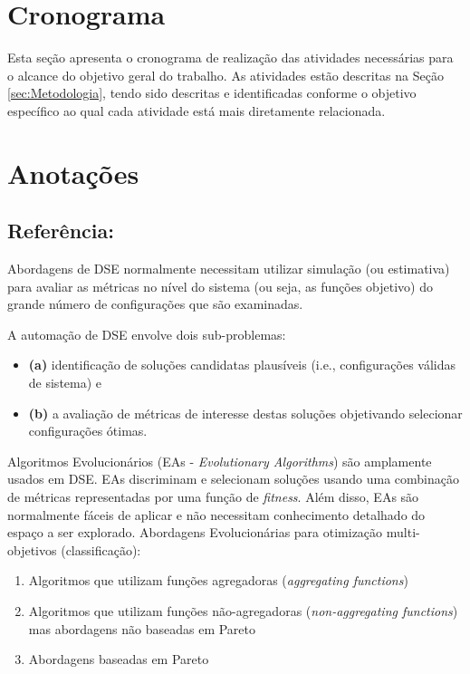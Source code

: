 \documentclass[tese-proposta,nocipinfo]{texufpel}
\begin{document}
\chapter{Cronograma}
Esta seção apresenta o cronograma de realização das atividades necessárias para o alcance do objetivo geral do trabalho. As atividades estão descritas na Seção \ref{sec:Metodologia}, tendo sido descritas e identificadas conforme o objetivo específico ao qual cada atividade está mais diretamente relacionada.




\chapter{Anotações}

\section {Referência: \cite{Panerati2017}}

Abordagens de DSE normalmente necessitam utilizar simulação (ou estimativa) para avaliar as métricas no nível do sistema (ou seja, as funções objetivo) do grande número de configurações que são examinadas.

A automação de DSE envolve dois sub-problemas: 
\begin{itemize}
\item \textbf{(a)} identificação de soluções candidatas plausíveis (i.e., configurações válidas de sistema) e 
\item \textbf{(b)} a avaliação de métricas de interesse destas soluções objetivando selecionar configurações ótimas.
\end{itemize}

Algoritmos Evolucionários (EAs - \textit{Evolutionary Algorithms}) são amplamente usados em DSE. EAs discriminam e selecionam soluções usando uma combinação de métricas representadas por uma função de \textit{fitness}. Além disso, EAs são normalmente fáceis de aplicar e não necessitam conhecimento detalhado do espaço a ser explorado.
Abordagens Evolucionárias para otimização multi-objetivos (classificação): 
\begin{enumerate}
\item Algoritmos que utilizam funções agregadoras (\textit{aggregating functions})
\item Algoritmos que utilizam funções não-agregadoras (\textit{non-aggregating functions}) mas abordagens não baseadas em Pareto
\item Abordagens baseadas em Pareto
\end{enumerate}
\end{document}

